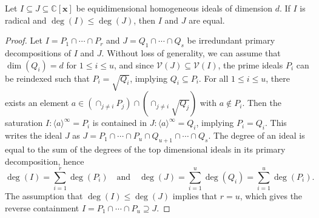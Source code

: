 \documentclass[ALCO,ThmDefs,Unicode,epreuves]{cedram}
\newcommand{\Cbb}{\mathbb{C}}
\newcommand{\V}{\mathcal{V}}
\newcommand{\x}{\mathbf{x}}
\begin{document}
\begin{lemm} \label{lem:EquidimEquality}
Let $I\subseteq J\subseteq\Cbb[\x]$ be equidimensional homogeneous ideals of dimension $d$. If $I$ is radical and $\deg(I)\leq \deg(J)$, then $I$ and $J$ are equal. 
\end{lemm}
\begin{proof}
Let $I = P_1 \cap \cdots \cap P_r$ and $J = Q_1 \cap \cdots \cap Q_s$ be irredundant primary decompositions of $I$ and $J$.
Without loss of generality, we can assume that $\dim(Q_i) = d$ for $1 \leq i \leq u$, and since $\V(J) \subseteq \V(I)$, the prime ideals $P_i$ can be reindexed such that $P_i=\sqrt{Q_i}$, 
implying $Q_i \subseteq P_i$. 
For all $1 \leq i \leq u$, there exists an element $a\in (\cap_{j\neq i}P_j) \cap (\cap_{j\neq i}\sqrt{Q_j})$ with $a\not\in P_i$. 
Then the saturation $I:\langle a\rangle^{\infty} = P_i $ is contained in $ J:\langle a\rangle^{\infty} = Q_i$, implying $P_i = Q_i$. 
This writes the ideal $J$ as $J=P_1\cap \cdots \cap P_{u}\cap Q_{u+1} \cap \cdots \cap Q_s$. 
The degree of an ideal is equal to the sum of the degrees of the top dimensional ideals in its primary decomposition, hence
\[
\deg(I) = \sum_{i=1}^r \deg(P_i)  \quad \text{and} \quad 
\deg(J) = \sum_{i=1}^u \deg(Q_i)=\sum_{i=1}^u \deg(P_i).
\]
The assumption that $\deg(I)\leq \deg(J)$ implies that $r=u$, which gives the reverse containment
$I = P_1 \cap \cdots \cap P_u \supseteq J$.
\end{proof}
\end{document}
